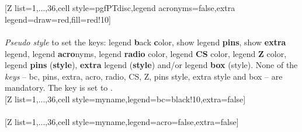 \\ [10pt]\makebox[\linewidth][c]{\scalebox{.6}{\pgfPT[Z list={1,...,36},cell style=pgfPTdisc,extra legend={draw=red,fill=red!10}]}}%
\\ [10pt][Z list={1,...,36},cell style=pgfPTdisc,legend acronyms=false,extra legend={draw=red,fill=red!10}]%
\\ [10pt]\makebox[\linewidth][c]{\scalebox{.6}{\pgfPT[Z list={1,...,36},cell style=pgfPTdisc,legend acronyms=false,extra legend={draw=red,fill=red!10}]}}%
\\ [0pt]\pgfPTendstyle%
\vfill%
\label{style_legend}%
%
{\textit{Pseudo style} to set the keys: legend \textbf{b}ack \textbf{c}olor, show legend \textbf{pins}, show \textbf{extra} legend, legend \textbf{acro}nyms, legend \textbf{radio} color, legend \textbf{CS} color, legend \textbf{Z} color, legend \textbf{pins} (\textbf{style}), \textbf{extra} legend (\textbf{style}) and/or legend \textbf{box} (style). None of the \textit{keys} -- bc, pins, extra, acro, radio, CS, Z, pins style, extra style and box -- are mandatory.
The key  is set to .
\\ [5pt]%
}%
\vfill%
\newpage%
[Z list={1,...,36},cell style=myname,legend={bc=black!10,extra=false}]%
\\ [5pt]\makebox[\linewidth][c]{\scalebox{.6}{\pgfPT[Z list={1,...,36},cell style=myname,legend={bc=black!10,extra=false}]}}%
\\ [10pt][Z list={1,...,36},cell style=myname,legend={acro=false,extra=false}]%
\\ [5pt]\makebox[\linewidth][c]{\scalebox{.6}{\pgfPT[Z list={1,...,36},cell style=myname,legend={acro=false,extra=false}]}}%
\\ [0pt]\pgfPTendstyle%
\endinput
